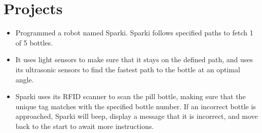 \documentclass[10pt,a4paper,sans]{moderncv} %
\begin{document}
\section {Projects}
\vspace{-1mm}
\begin{itemize}
\vspace{-2mm}
\item{Programmed a robot named Sparki. Sparki follows specified paths to fetch 1 of 5 bottles.} 
\item{It uses light sensors to make sure that it stays on the defined path, and uses its ultrasonic sensors to find the fastest path to the bottle at an optimal angle.} 
\item{Sparki uses its RFID scanner to scan the pill bottle, making sure that the unique tag  matches with the specified bottle number. If an incorrect bottle is approached, Sparki will beep, display a message that it is incorrect, and move back to the start to await more instructions.}
\end{itemize}
\end{document}
